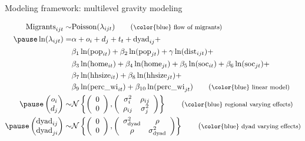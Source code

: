 \documentclass{beamer}
\begin{document}
\begin{frame}[fragile]{Modeling framework: multilevel gravity modeling}
\begin{small}
  \begin{align}
  	\text{Migrants}_{ijt} \sim & \text{Poisson}(\lambda_{ijt})\tag{\footnotesize \color{blue} flow of migrants}\\ \pause
  	\ln(\lambda_{ijt}) = & \alpha +   o_i + d_j + t_t + \text{dyad}_{ij}+ \notag \\
  	& \beta_1 \ln(\text{pop}_{it}) + \beta_2
  	\ln(\text{pop}_{jt}) +
  	\gamma \ln(\text{dist}_{ijt}) + \notag \\
  	& \beta_3 \ln(\text{home}_{it}) +
  	\beta_4 \ln(\text{home}_{jt}) +
  	\beta_5 \ln(\text{soc}_{it}) + \beta_6
	 \ln(\text{soc}_{jt}) + \notag \\
	&  \beta_{7}\ln(\text{hhsize}_{it}) +
	 \beta_{8}\ln(\text{hhsize}_{jt}) + \notag \\
	& \beta_{9}\ln(\text{perc\_wi}_{it}) +
	 \beta_{10}\ln(\text{perc\_wi}_{jt})
	 \tag{\footnotesize \color{blue} linear model} \\ \pause
	\begin{pmatrix}o_i\\
	d_j
\end{pmatrix} \sim &\mathcal{N} \left\{\left(\begin{array}{c}
	0\\
	0
\end{array}\right),
\left(                                        
\begin{array}{cc}
	\sigma^2_i & \rho_{ij} \\
	\rho_{ij} & \sigma^2_{j} 
\end{array}
\right)
\right\} \tag{\footnotesize \color{blue} regional varying effects} \\ \pause
	\begin{pmatrix}\text{dyad}_{ij}\\
	\text{dyad}_{ji}
\end{pmatrix} \sim & \mathcal{N} \left\{\left(\begin{array}{c}
	0\\
	0
\end{array}\right),
\left(                                        
\begin{array}{cc}
	\sigma^2_{\text{dyad}} & \rho \\
	\rho & \sigma^2_{\text{dyad}} 
\end{array}
\right)
\right\} \tag{\footnotesize \color{blue} dyad varying effects} 
\end{align}
\end{small}
\end{frame}
\end{document}
